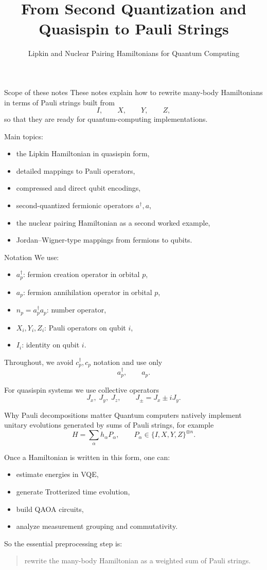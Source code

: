 \documentclass[aspectratio=169]{beamer}
\title{From Second Quantization and Quasispin to Pauli Strings}
\subtitle{Lipkin and Nuclear Pairing Hamiltonians for Quantum Computing}
\author{}
\date{}
\begin{document}
\frame{\titlepage}

\begin{frame}{Scope of these notes}
These notes explain how to rewrite many-body Hamiltonians in terms of Pauli strings
built from
\[
I,\qquad X,\qquad Y,\qquad Z,
\]
so that they are ready for quantum-computing implementations.

\medskip

Main topics:
\begin{itemize}
\item the Lipkin Hamiltonian in quasispin form,
\item detailed mappings to Pauli operators,
\item compressed and direct qubit encodings,
\item second-quantized fermionic operators \(a^\dagger,a\),
\item the nuclear pairing Hamiltonian as a second worked example,
\item Jordan--Wigner-type mappings from fermions to qubits.
\end{itemize}
\end{frame}

\begin{frame}{Notation}
We use:
\begin{itemize}
\item \(a_p^\dagger\): fermion creation operator in orbital \(p\),
\item \(a_p\): fermion annihilation operator in orbital \(p\),
\item \(n_p=a_p^\dagger a_p\): number operator,
\item \(X_i,Y_i,Z_i\): Pauli operators on qubit \(i\),
\item \(I_i\): identity on qubit \(i\).
\end{itemize}

Throughout, we avoid \(c_p^\dagger,c_p\) notation and use only
\[
a_p^\dagger,\qquad a_p.
\]

For quasispin systems we use collective operators
\[
J_x,\; J_y,\; J_z,\qquad J_\pm = J_x \pm i J_y.
\]
\end{frame}

\begin{frame}{Why Pauli decompositions matter}
Quantum computers natively implement unitary evolutions generated by sums of Pauli strings,
for example
\[
H = \sum_\alpha h_\alpha P_\alpha,
\qquad
P_\alpha \in \{I,X,Y,Z\}^{\otimes n}.
\]

Once a Hamiltonian is written in this form, one can:
\begin{itemize}
\item estimate energies in VQE,
\item generate Trotterized time evolution,
\item build QAOA circuits,
\item analyze measurement grouping and commutativity.
\end{itemize}

So the essential preprocessing step is:
\begin{quote}
rewrite the many-body Hamiltonian as a weighted sum of Pauli strings.
\end{quote}
\end{frame}
\end{document}
